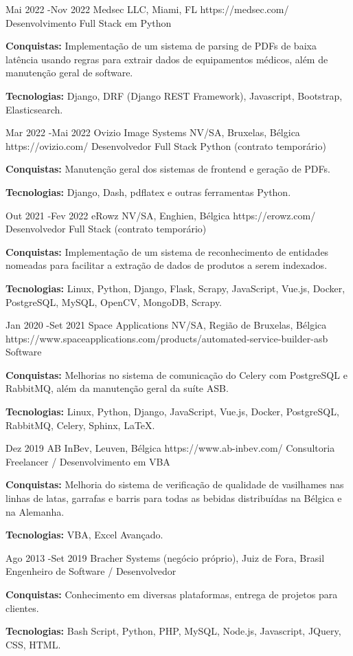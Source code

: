 \documentclass[10pt]{article} %
\begin{document}
\job
{Mai 2022 -}{Nov 2022}
{Medsec LLC, Miami, FL}
{https://medsec.com/}
{Desenvolvimento Full Stack em Python}
{\rule{0mm}{2mm}\textbf{Conquistas:} Implementação de um sistema de parsing de PDFs de baixa latência usando regras para extrair dados de equipamentos médicos, além de manutenção geral de software.\\
\rule{0mm}{3mm}\textbf{Tecnologias:} Django, DRF (Django REST Framework), Javascript, Bootstrap, Elasticsearch.}


\job
{Mar 2022 -}{Mai 2022}
{Ovizio Image Systems NV/SA, Bruxelas, Bélgica}
{https://ovizio.com/}
{Desenvolvedor Full Stack Python (contrato temporário)}
{\rule{0mm}{2mm}\textbf{Conquistas:} Manutenção geral dos sistemas de frontend e geração de PDFs.\\
\rule{0mm}{3mm}\textbf{Tecnologias:} Django, Dash, pdflatex e outras ferramentas Python.}


\job
{Out 2021 -}{Fev 2022}
{eRowz NV/SA, Enghien, Bélgica}
{https://erowz.com/}
{Desenvolvedor Full Stack (contrato temporário)}
{\rule{0mm}{2mm}\textbf{Conquistas:} Implementação de um sistema de reconhecimento de entidades nomeadas para facilitar a extração de dados de produtos a serem indexados.\\
\rule{0mm}{3mm}\textbf{Tecnologias:} Linux, Python, Django, Flask, Scrapy, JavaScript, Vue.js, Docker, PostgreSQL, MySQL, OpenCV, MongoDB, Scrapy.}


\job
{Jan 2020 -}{Set 2021}
{Space Applications NV/SA, Região de Bruxelas, Bélgica}
{https://www.spaceapplications.com/products/automated-service-builder-asb}
{Software}
{\rule{0mm}{2mm}\textbf{Conquistas:} Melhorias no sistema de comunicação do Celery com PostgreSQL e RabbitMQ, além da manutenção geral da suíte ASB.\\
\rule{0mm}{3mm}\textbf{Tecnologias:} Linux, Python, Django, JavaScript, Vue.js, Docker, PostgreSQL, RabbitMQ, Celery, Sphinx, LaTeX.}


\job
{Dez 2019}{}
{AB InBev, Leuven, Bélgica}
{https://www.ab-inbev.com/}
{Consultoria Freelancer / Desenvolvimento em VBA}
{\rule{0mm}{2mm}\textbf{Conquistas:} Melhoria do sistema de verificação de qualidade de vasilhames nas linhas de latas, garrafas e barris para todas as bebidas distribuídas na Bélgica e na Alemanha.\\
\rule{0mm}{3mm}\textbf{Tecnologias:} VBA, Excel Avançado.}


\job
{Ago 2013 -}{Set 2019}
{Bracher Systems (negócio próprio), Juiz de Fora, Brasil}
{}
{Engenheiro de Software / Desenvolvedor}
{\rule{0mm}{2mm}\textbf{Conquistas:} Conhecimento em diversas plataformas, entrega de projetos para clientes.\\
\rule{0mm}{3mm}\textbf{Tecnologias:} Bash Script, Python, PHP, MySQL, Node.js, Javascript, JQuery, CSS, HTML.}
\end{document}
